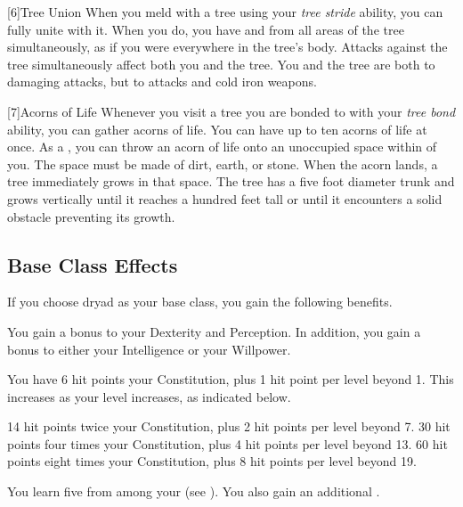     [6]{Tree Union} When you meld with a tree using your \textit{tree stride} ability, you can fully unite with it.
      When you do, you have  and  from all areas of the tree simultaneously, as if you were everywhere in the tree's body.
      Attacks against the tree simultaneously affect both you and the tree.
      You and the tree are both \impervious to damaging attacks, but \vulnerable to \atFire attacks and cold iron weapons.

    [7]{Acorns of Life} Whenever you visit a tree you are bonded to with your \textit{tree bond} ability, you can gather acorns of life.
      You can have up to ten acorns of life at once.
      As a , you can throw an acorn of life onto an unoccupied  space within \medrange of you.
      The space must be made of dirt, earth, or stone.
      When the acorn lands, a tree immediately grows in that space.
      The tree has a five foot diameter trunk and grows vertically until it reaches a hundred feet tall or until it encounters a solid obstacle preventing its growth.

  \subsection{Base Class Effects}
    If you choose dryad as your base class, you gain the following benefits.

      You gain a  bonus to your Dexterity and Perception. In addition, you gain a  bonus to either your Intelligence or your Willpower.

      You have 6 hit points \add  your Constitution, plus 1 hit point per level beyond 1.
      This increases as your level increases, as indicated below.
      \begin{itemize}
         14 hit points \add twice your Constitution, plus 2 hit points per level beyond 7.
         30 hit points \add four times your Constitution, plus 4 hit points per level beyond 13.
         60 hit points \add eight times your Constitution, plus 8 hit points per level beyond 19.
      \end{itemize}

      You learn five  from among your  (see ). You also gain an additional .

